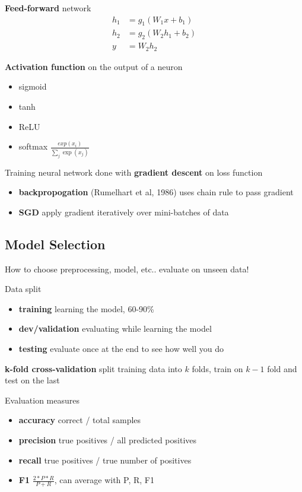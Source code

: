 \documentclass[]{article}
\theoremstyle{definition}
\begin{document}
\textbf{Feed-forward} network
\begin{align}
    h_1 &=  g_1(W_1 x + b_1) \\
    h_2 &=  g_2(W_2 h_1 + b_2) \\
    y &= W_2 h_2
\end{align}

\textbf{Activation function} on the output of a neuron
\begin{itemize}
    \item sigmoid
    \item tanh
    \item ReLU
    \item softmax $\frac{exp(x_i)}{\sum_j \exp(x_j)}$
\end{itemize}

Training neural network done with \textbf{gradient descent} on loss function
\begin{itemize}
    \item \textbf{backpropogation} (Rumelhart et al, 1986) uses chain rule to pass gradient
    \item \textbf{SGD} apply gradient iteratively over mini-batches of data
\end{itemize}


\subsection{Model Selection}%
\label{sub:model_selection}

How to choose preprocessing, model, etc.. evaluate on unseen data!

Data split
\begin{itemize}
    \item \textbf{training} learning the model, 60-90\%
    \item \textbf{dev/validation} evaluating while learning the model
    \item \textbf{testing} evaluate once at the end to see how well you do
\end{itemize}

\textbf{k-fold cross-validation} split training data into $k$ folds, train on $k-1$ fold and test on the last

Evaluation measures
\begin{itemize}
    \item \textbf{accuracy} correct / total samples
    \item \textbf{precision} true positives / all predicted positives
    \item \textbf{recall} true positives / true number of positives
    \item \textbf{F1} $\frac{2 * P * R}{P+R}$, can average with P, R, F1
\end{itemize}
\end{document}
